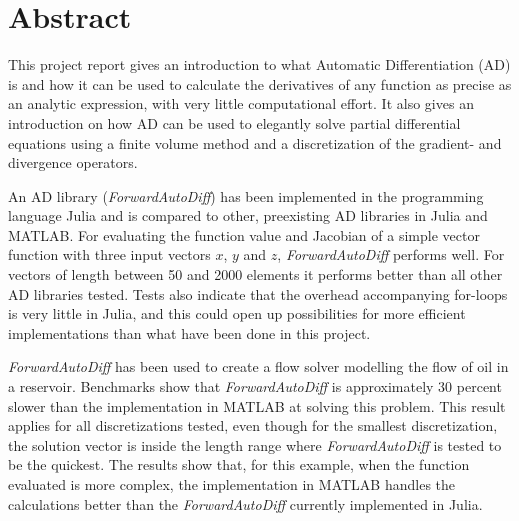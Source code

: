 \chapter*{Abstract}
This project report gives an introduction to what Automatic Differentiation (AD) is and how it can be used to calculate the derivatives of any function as precise as an analytic expression, with very little computational effort. It also gives an introduction on how AD can be used to elegantly solve partial differential equations using a finite volume method and a discretization of the gradient- and divergence operators. 

An AD library (\textit{ForwardAutoDiff}) has been implemented in the programming language Julia and is compared to other, preexisting AD libraries in Julia and MATLAB. For evaluating the function value and Jacobian of a simple vector function with three input vectors $x$, $y$ and $z$, \textit{ForwardAutoDiff} performs well. For vectors of length between 50 and 2000 elements it performs better than all other AD libraries tested. Tests also indicate that the overhead accompanying for-loops is very little in Julia, and this could open up possibilities for more efficient implementations than what have been done in this project.

\textit{ForwardAutoDiff} has been used to create a flow solver modelling the flow of oil in a reservoir. Benchmarks show that \textit{ForwardAutoDiff} is approximately 30 percent slower than the implementation in MATLAB at solving this problem. This result applies for all discretizations tested, even though for the smallest discretization, the solution vector is inside the length range where \textit{ForwardAutoDiff} is tested to be the quickest. The results show that, for this example, when the function evaluated is more complex, the implementation in MATLAB handles the calculations better than the \textit{ForwardAutoDiff} currently implemented in Julia. 